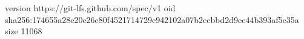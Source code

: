 version https://git-lfs.github.com/spec/v1
oid sha256:174655a28e20e26c80f4521714729c942102a07b2ccbbd2d9ee44b393af5c35a
size 11068
